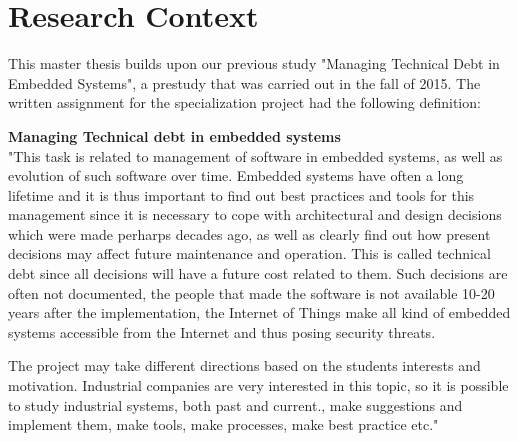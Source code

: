






\section{Research Context}
This master thesis builds upon our previous study "Managing Technical Debt in Embedded Systems"\cite{forprosjekt}, a prestudy that was carried out in the fall of 2015. The written assignment for the specialization project had the following definition:

\begin{addmargin}[2em]{2em}
\textbf{Managing Technical debt in embedded systems} \\
"This task is related to management of software in embedded systems, as well as evolution of such software over time. Embedded systems have often a long lifetime and it is thus important to find out best practices and tools for this management since it is necessary to cope with architectural and design decisions which were made perharps decades ago, as well as clearly find out how present decisions may affect future maintenance and operation. This is called technical debt since all decisions will have a future cost related to them. Such decisions are often not documented, the people that made the software is not available 10-20 years after the implementation, the Internet of Things make all kind of embedded systems accessible from the Internet and thus posing security threats.

The project may take different directions based on the students interests and motivation. Industrial companies are very interested in this topic, so it is possible to study industrial systems, both past and current., make suggestions and implement them, make tools, make processes, make best practice etc."
\end{addmargin}

